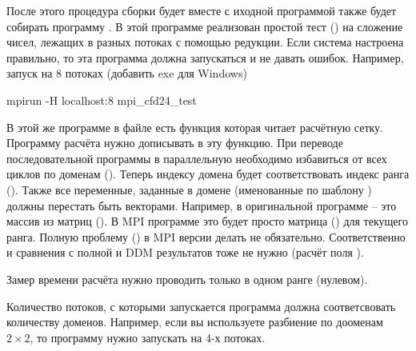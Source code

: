 После этого процедура сборки будет вместе с иходной программой  также будет собирать программу .
В этой программе реализован простой тест () на сложение чисел, лежащих в разных потоках с помощью редукции.
Если система настроена правильно, то эта программа должна запускаться и не давать ошибок. Например, запуск на 8 потоках (добавить exe для Windows)
\begin{bashcode}
mpirun -H localhost:8 mpi_cfd24_test 
\end{bashcode}

В этой же программе в файле  есть функция 
которая читает расчётную сетку. Программу расчёта нужно дописывать в эту функцию.
При переводе последовательной программы в параллельную необходимо
избавиться от всех циклов по доменам (). Теперь индексу домена будет соответствовать индекс ранга ().
Также все переменные, заданные в домене (именованные по шаблону )
должны перестать быть векторами. Например,  в оригинальной программе -- это массив из матриц ().
В MPI программе это будет просто матрица () для текущего ранга.
Полную проблему () в MPI версии делать не обязательно.
Соответственно и сравнения с полной и DDM результатов тоже не нужно (расчёт поля ).

Замер времени расчёта нужно проводить только в одном ранге (нулевом).

Количество потоков, с которыми запускается программа должна соответсвовать количеству доменов.
Например, если вы используете разбиение по дооменам $2\times2$, то программу нужно запускать на 4-х потоках.


